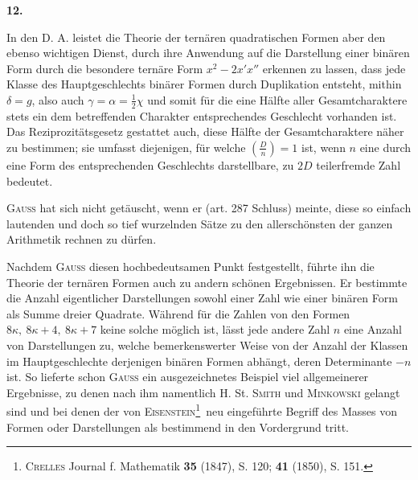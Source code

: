 \newcommand{\ThreeHollowSquares}{\tikz[baseline=-.3ex,x=1ex,y=1ex,line width=.09ex]{\draw(0,0)rectangle(.65,.65);\draw(1.3,0)rectangle(1.95,.65);\draw(.65,1)rectangle(1.3,1.65);}}
\begin{center}\bfseries 12.\end{center}
\noindent\hspace*{\parindent}In den D. A. leistet die Theorie der ternären quadratischen Formen aber den ebenso wichtigen Dienst, durch ihre Anwendung auf die Darstellung einer binären Form durch die besondere ternäre Form \(x^2-2x'x''\) erkennen zu lassen, dass jede Klasse des Hauptgeschlechts binärer Formen durch Duplikation entsteht, mithin \(\delta=g\), also auch \(\gamma=\alpha=\frac12\chi\) und somit für die eine Hälfte aller Gesamtcharaktere stets ein dem betreffenden Charakter entsprechendes Geschlecht vorhanden ist. Das Reziprozitätsgesetz gestattet auch, diese Hälfte der Gesamtcharaktere näher zu bestimmen; sie umfasst diejenigen, für welche
\newpage{}
\noindent \(\left(\frac{D}{n}\right)=1\) ist, wenn \(n\) eine durch eine Form des entsprechenden Geschlechts darstellbare, zu \(2D\) teilerfremde Zahl bedeutet.

\textsc{Gauss} hat sich nicht getäuscht, wenn er (art. 287 Schluss) meinte, diese so einfach lautenden und doch so tief wurzelnden Sätze zu den allerschönsten der ganzen Arithmetik rechnen zu dürfen.

Nachdem \textsc{Gauss} diesen hochbedeutsamen Punkt festgestellt, führte ihn die Theorie der ternären Formen auch zu andern schönen Ergebnissen. Er bestimmte die Anzahl eigentlicher Darstellungen sowohl einer Zahl wie einer binären Form als Summe dreier Quadrate. Während für die Zahlen von den Formen \(8\kappa,\ 8\kappa+4,\ 8\kappa+7\) keine solche möglich ist, lässt jede andere Zahl \(n\) eine Anzahl von Darstellungen zu, welche bemerkenswerter Weise von der Anzahl der Klassen im Hauptgeschlechte derjenigen binären Formen abhängt, deren Determinante \(-n\) ist. So lieferte schon \textsc{Gauss} ein ausgezeichnetes Beispiel viel allgemeinerer Ergebnisse, zu denen nach ihm namentlich H. St. \textsc{Smith} und \textsc{Minkowski} gelangt sind und bei denen der von \textsc{Eisenstein}\footnote{\textsc{Crelles} Journal f. Mathematik \textbf{35} (1847), S. 120; \textbf{41} (1850), S. 151.}\ neu eingeführte Begriff des Masses von Formen oder Darstellungen als bestimmend in den Vordergrund tritt.

